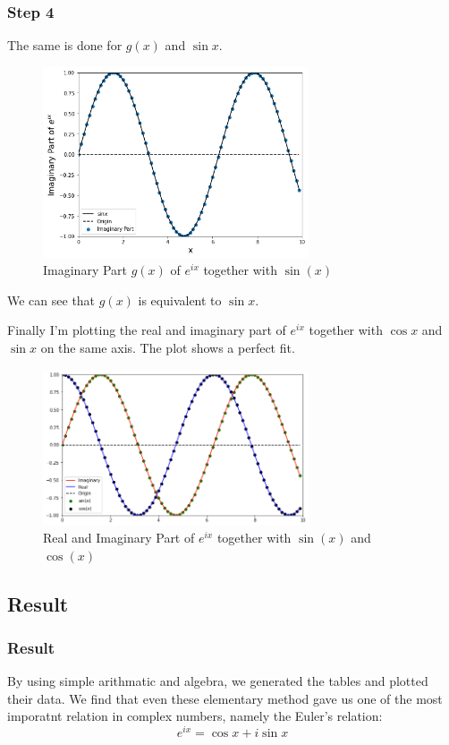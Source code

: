 \documentclass{beamer}
\begin{document}
\begin{frame}
    \frametitle{Step 4}
    The same is done for $g(x)$ and $\sin{x}$.
        \begin{figure}
        \centering
        \includegraphics[width=0.7\textwidth, height=0.55\textheight]{img/imaginary.png}
        \caption{\label{fig:imag}Imaginary Part $g(x)$ of $e^{ix}$ together with $\sin(x)$}
    \end{figure}
    \pause
    We can see that $g(x)$ is equivalent to $\sin{x}$.
\end{frame}
\begin{frame}
    Finally I'm plotting the real and imaginary part of $e^{ix}$ together with $\cos{x}$ and $\sin{x}$ on the same axis. The plot shows a perfect fit.
    \begin{figure}
        \centering
        \includegraphics[width=0.7\textwidth]{img/all.png}
        \caption{\label{fig:all}Real and Imaginary Part of $e^{ix}$ together with $\sin(x)$ and $\cos(x)$}
    \end{figure}
\end{frame}

\subsection{Result}
\begin{frame}
    \frametitle{Result}
    By using simple arithmatic and algebra, we generated the tables and plotted their data. We find that even these elementary method gave us one of the most imporatnt relation in complex numbers, namely the Euler's relation:
    \begin{equation*}
            e^{ix} = \cos{x} + i\sin{x}
    \end{equation*}
\end{frame}
\end{document}
